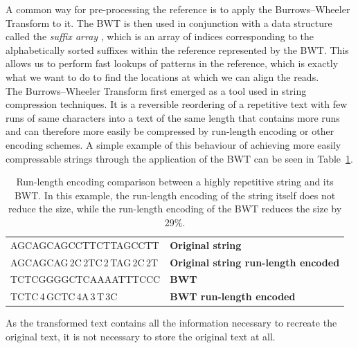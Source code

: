 \documentclass[a4paper,12pt,twoside,BCOR=10mm]{scrbook}
\begin{document}
A common way for pre-processing the reference is to apply the Burrows--Wheeler Transform \citep{Burrows1994} to it.
The BWT is then used in conjunction with a data structure
called the \textit{suffix array} \citep{Puglisi2007}, which
is an array of indices corresponding to the alphabetically sorted suffixes
within the reference represented by the BWT.
This allows us to
perform fast lookups of patterns in the reference, which is exactly what we want
to do to find the locations at which we can align the reads. \\
The Burrows--Wheeler Transform
first emerged as a tool used in string compression techniques.
It is a reversible reordering of a
repetitive text with few runs of same characters into a text of the same length that contains more runs
and can therefore more easily be compressed by run-length encoding or other encoding schemes.
A simple example of this behaviour of achieving more easily compressable strings through the application of the BWT
can be seen in Table~\ref{table:evo_background_bwt_run_enc}.
\begin{table}[htb]
\centering
\caption[Run-length encoding comparison between a repetitive string and its BWT]{Run-length encoding comparison between a highly repetitive string and its BWT. In this example, the run-length encoding of the string itself does not reduce the size, while the run-length encoding of the BWT reduces the size by 29\%.}
   \begin{tabularx}{\textwidth}{ | X | X | }
   \hline
   AGCAGCAGCCTTCTTAGCCTT & \textbf{Original string} \\
   AGCAGCAG\,2C\,2TC\,2\,TAG\,2C\,2T & \textbf{Original string run-length encoded} \\
   \hline
   TCTCGGGGCTCAAAATTTCCC & \textbf{BWT} \\
   TCTC\,4\,GCTC\,4A\,3\,T\,3C & \textbf{BWT run-length encoded} \\
   \hline
   \end{tabularx}
\label{table:evo_background_bwt_run_enc}
\end{table}
As the transformed text contains all the information necessary to recreate the
original text, it is not necessary to store the original text at all.
\end{document}
